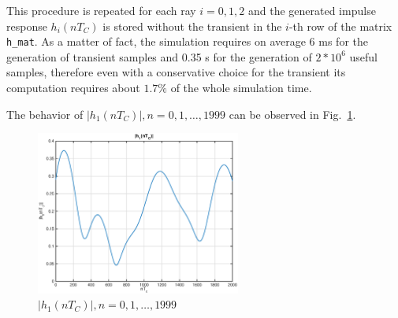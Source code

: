 \documentclass[10pt]{article}
\begin{document}
This procedure is repeated for each ray $i = 0, 1, 2$ and the generated impulse response $h_i(nT_C)$ is stored without the transient in the $i$-th row of the matrix \texttt{h\_mat}. As a matter of fact, the simulation requires on average 6 ms for the generation of transient samples and 0.35 s for the generation of $2*10^6$ useful samples, therefore even with a conservative choice for the transient its computation requires about $1.7\%$ of the whole simulation time.

The behavior of $|h_1(nT_C)|, n = 0, 1, \dots, 1999$ can be observed in Fig.~\ref{fig:h1}.

\begin{figure}[h!]
  \centering
  \includegraphics[width = 0.6\textwidth]{p01_h1}
  \caption{$|h_1(nT_C)|, n = 0, 1, \dots, 1999$}
  \label{fig:h1}
\end{figure}
\end{document}
